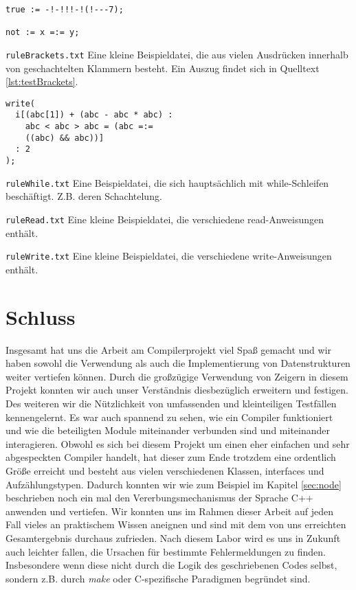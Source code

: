 \documentclass[
a4paper,   %
11pt,      %
oneside,   %
onecolumn, %
final      %
]{article}
\begin{document}
\begin{description}
\begin{lstlisting}[language=SysProgLang, caption={ruleExp.txt}, label=lst:testExp]
true := -!-!!!-!(!---7);

not := x =:= y;
\end{lstlisting}

\item{\texttt{ruleBrackets.txt}} Eine kleine Beispieldatei, die aus vielen Ausdrücken innerhalb von geschachtelten Klammern besteht. Ein Auszug findet sich in Quelltext \ref{lst:testBrackets}.

\begin{lstlisting}[language=SysProgLang, caption={ruleBrackets.txt}, label=lst:testBrackets]
write(
  i[(abc[1]) + (abc - abc * abc) : 
    abc < abc > abc = (abc =:=
    ((abc) && abc))]
  : 2
);
\end{lstlisting}

\item{\texttt{ruleWhile.txt}} Eine Beispieldatei, die sich hauptsächlich mit while-Schleifen beschäftigt. Z.B. deren Schachtelung.

\item{\texttt{ruleRead.txt}} Eine kleine Beispieldatei, die verschiedene read-Anweisungen enthält. 

\item{\texttt{ruleWrite.txt}} Eine kleine Beispieldatei, die verschiedene write-Anweisungen enthält.
\end{description}

\section{Schluss}
Insgesamt hat uns die Arbeit am Compilerprojekt viel Spaß gemacht und wir haben sowohl die Verwendung als auch die Implementierung von Datenstrukturen weiter vertiefen können. Durch die großzügige Verwendung von Zeigern in diesem Projekt konnten wir auch unser Verständnis diesbezüglich erweitern und festigen. Des weiteren wir die Nützlichkeit von umfassenden und kleinteiligen Testfällen kennengelernt. Es war auch spannend zu sehen, wie ein Compiler funktioniert und wie die beteiligten Module miteinander verbunden sind und miteinander interagieren. Obwohl es sich bei diesem Projekt um einen eher einfachen und sehr abgespeckten Compiler handelt, hat dieser zum Ende trotzdem eine ordentlich Größe erreicht und besteht aus vielen verschiedenen Klassen, interfaces und Aufzählungstypen. Dadurch konnten wir wie zum Beispiel im Kapitel \ref{sec:node} beschrieben noch ein mal den Vererbungsmechanismus der Sprache C++ anwenden und vertiefen. Wir konnten uns im Rahmen dieser Arbeit auf jeden Fall vieles an praktischem Wissen aneignen und sind mit dem von uns erreichten Gesamtergebnis durchaus zufrieden. Nach diesem Labor wird es uns in Zukunft auch leichter fallen, die Ursachen für bestimmte Fehlermeldungen zu finden. Insbesondere wenn diese nicht durch die Logik des geschriebenen Codes selbst, sondern z.B. durch \emph{make} oder C-spezifische Paradigmen begründet sind.
\end{document}
